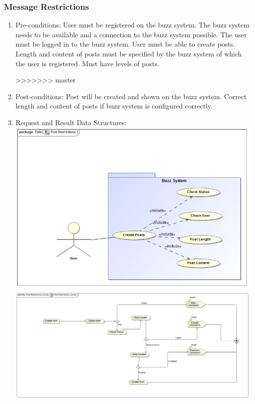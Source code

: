 \documentclass[12pt, oneside]{book}
\begin{document}
\subsubsection{Message Restrictions}
\begin{enumerate}
 \item Pre-conditions:  User must be registered on the buzz system. The buzz system needs to be available and a connection to the buzz system possible. The user must be logged in to the buzz system. User must be able to create posts. Length and content of posts must be specified by the buzz system of which the user is registered. Must have levels of posts.
 
>>>>>>> master
 \item Post-conditions: Post will be created and shown on the buzz system. Correct length and content of posts if buzz system is configured correctly.
   \\
 \item Request and Result Data Structures:\\
  \includegraphics[scale=0.4]{PostRestrictions}\\
 \includegraphics[scale=0.35]{PostRestrictionsActivity} 
\end{enumerate}
\end{document}
